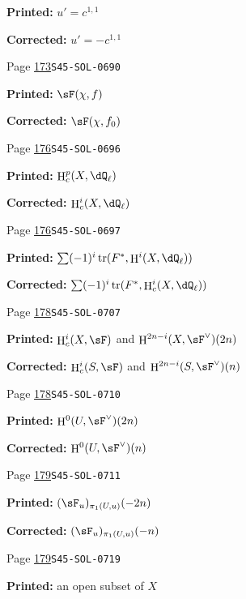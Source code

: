 \documentclass[oneside]{book}
\DeclareMathOperator{\h}{H}
\DeclareMathOperator{\tr}{tr}
\theoremstyle{sga-source}
\theoremstyle{sga-source-dash}
\theoremstyle{sga-source-dotdash}
\theoremstyle{sga-source-number-note-dash}
\theoremstyle{sga-source-note-number-dotdash}
\theoremstyle{sga-source-example-dotdash}
\theoremstyle{sga-source-inline-number}
\theoremstyle{sga-source-bare-number}
\theoremstyle{sga-source}
\begin{document}
\begin{description}
\par\noindent\textbf{Printed:} \(u'=c^{1,1}\)
\par\noindent\textbf{Corrected:} \(u'=-c^{1,1}\)
\smallskip
\item[\hypertarget{apparatus:EN-0099}{99}] Page \hyperlink{printpage:en:173}{173}\quad\texttt{S45-SOL-0690}
\par\noindent\textbf{Printed:} \(\sF(\chi,f)\)
\par\noindent\textbf{Corrected:} \(\sF(\chi,f_0)\)
\smallskip
\item[\hypertarget{apparatus:EN-0100}{100}] Page \hyperlink{printpage:en:176}{176}\quad\texttt{S45-SOL-0696}
\par\noindent\textbf{Printed:} \(\h_c^p(X,\dQ_\ell)\)
\par\noindent\textbf{Corrected:} \(\h_c^i(X,\dQ_\ell)\)
\smallskip
\item[\hypertarget{apparatus:EN-0101}{101}] Page \hyperlink{printpage:en:176}{176}\quad\texttt{S45-SOL-0697}
\par\noindent\textbf{Printed:} \(\sum (-1)^i \tr(F^\ast,\h^i(X,\dQ_\ell))\)
\par\noindent\textbf{Corrected:} \(\sum (-1)^i \tr(F^\ast,\h_c^i(X,\dQ_\ell))\)
\smallskip
\item[\hypertarget{apparatus:EN-0102}{102}] Page \hyperlink{printpage:en:178}{178}\quad\texttt{S45-SOL-0707}
\par\noindent\textbf{Printed:} $\h_c^i(X,\sF)$ and $\h^{2n-i}(X,\sF^\vee)(2n)$
\par\noindent\textbf{Corrected:} $\h_c^i(S,\sF)$ and $\h^{2n-i}(S,\sF^\vee)(n)$
\smallskip
\item[\hypertarget{apparatus:EN-0103}{103}] Page \hyperlink{printpage:en:178}{178}\quad\texttt{S45-SOL-0710}
\par\noindent\textbf{Printed:} \(\h^0(U,\sF^\vee)(2n)\)
\par\noindent\textbf{Corrected:} \(\h^0(U,\sF^\vee)(n)\)
\smallskip
\item[\hypertarget{apparatus:EN-0104}{104}] Page \hyperlink{printpage:en:179}{179}\quad\texttt{S45-SOL-0711}
\par\noindent\textbf{Printed:} \((\sF_u)_{\pi_1(U,u)}(-2n)\)
\par\noindent\textbf{Corrected:} \((\sF_u)_{\pi_1(U,u)}(-n)\)
\smallskip
\item[\hypertarget{apparatus:EN-0105}{105}] Page \hyperlink{printpage:en:179}{179}\quad\texttt{S45-SOL-0719}
\par\noindent\textbf{Printed:} an open subset of $X$

\end{description}
\end{document}
